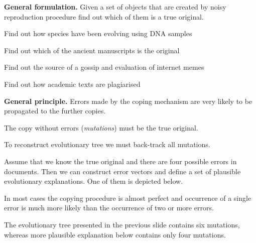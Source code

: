 \documentclass[landscape,footrule]{foils}
\begin{document}
\titlefoil




\textbf{General formulation.}
Given a set of objects that are created by noisy reproduction procedure find out which of them is a true original.

\begin{diamonds}
\item Find out how species have been evolving using DNA samples
\item Find out which of the ancient manuscripts is the original
\item Find out the source of a gossip and evaluation of internet memes
\item Find out how academic texts are plagiarised  
\end{diamonds}
\vspace*{2cm}

\textbf{General principle.} Errors made by the coping mechanism are very likely to be propagated to the further copies.
\begin{triangles}
\item The copy without errors (\emph{mutations}) must be the true original.
\item To reconstruct evolutionary tree we must back-track all mutations.
\end{triangles}


Assume that we know the true original and there are four possible errors in documents. Then we can construct error vectors and define a set of plausible evolutionary explanations. One of them is depicted below.\vspace*{1cm}


\vspace*{0.5cm}

In most cases the copying procedure is almost perfect and occurrence of a single error is much more likely than the occurrence of two or more errors.\vspace*{-0.5cm}   


The evolutionary tree presented in the previous slide contains six mutations, whereas more plausible explanation below contains only four mutations.\vspace*{1cm}

\vspace*{0.5cm}
\end{document}
